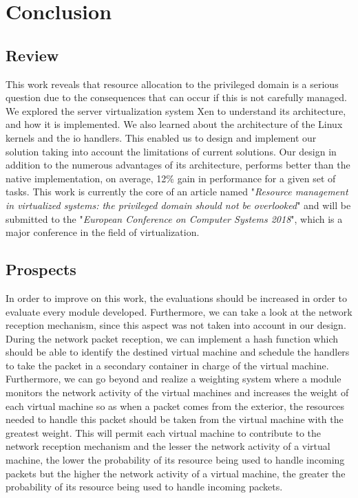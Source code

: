 \chapter*{Conclusion}
\label{chap:conclusion}

\section*{Review}
This work reveals that resource allocation to the privileged domain is a serious question due to the consequences that can occur if this is not carefully managed. We explored the server virtualization system Xen to understand its architecture, and how it is implemented. We also learned about the architecture of the Linux \glspl{kernel} and the \acrshort{io} handlers. This enabled us to design and implement our solution taking into account the limitations of current solutions. Our design in addition to the numerous advantages of its architecture, performs better than the native implementation, on average, 12\% gain in performance for a given set of tasks. This work is currently the core of an article named "\textit{Resource management in virtualized systems: the privileged domain should not be overlooked}" and will be submitted to the "\textit{European Conference on Computer Systems 2018}", which is a major conference in the field of virtualization.


\section*{Prospects}

In order to improve on this work, the evaluations should be increased in order to evaluate every module developed. Furthermore, we can take a look at the network reception mechanism, since this aspect was not taken into account in our design. During the network packet reception, we can implement a hash function which should be able to identify the destined virtual machine and schedule the handlers to take the packet in a secondary container in charge of the virtual machine. Furthermore, we can go beyond and realize a weighting system where a module monitors the network activity of the virtual machines and increases the weight of each virtual machine so as when a packet comes from the exterior, the resources needed to handle this packet should be taken from the virtual machine with the greatest weight. This will permit each virtual machine to contribute to the network reception mechanism and the lesser the network activity of a virtual machine, the lower the probability of its resource being used to handle incoming packets but the higher the network activity of a virtual machine, the greater the probability of its resource being used to handle incoming packets. 
